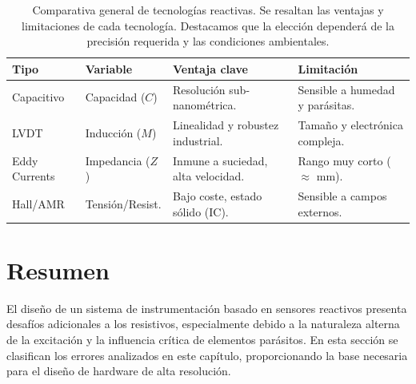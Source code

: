 \begin{table}[!ht]
    \centering
    \forceversofloat %
    \caption[Comparativa general de tecnologías reactivas.]{Comparativa general de tecnologías reactivas. Se resaltan las ventajas y limitaciones de cada tecnología. Destacamos que la elección dependerá de la precisión requerida y las condiciones ambientales.\protect\label{tab:comparativa_final}}
    \setlength{\tabcolsep}{3pt}
    \begin{tabularx}{\linewidth}{M{2cm} M{2cm} X X}
        \toprule
        \textbf{Tipo} & \textbf{Variable} & \textbf{Ventaja clave} & \textbf{Limitación} \\
        \midrule
        Capacitivo & Capacidad ($C$) & Resolución sub-nanométrica. & Sensible a humedad y parásitas. \\
        LVDT & Inducción ($M$) & Linealidad y robustez industrial. & Tamaño y electrónica compleja. \\
        Eddy Currents & Impedancia ($Z$) & Inmune a suciedad, alta velocidad. & Rango muy corto ($\approx$ mm). \\
        Hall/AMR & Tensión/Resist. & Bajo coste, estado sólido (IC). & Sensible a campos externos. \\
        \bottomrule
    \end{tabularx}   
\end{table}


\section{Resumen}\label{sec:errores_reactivos}

El diseño de un sistema de instrumentación basado en sensores reactivos presenta desafíos adicionales a los resistivos, especialmente debido a la naturaleza alterna de la excitación y la influencia crítica de elementos parásitos. En esta sección se clasifican los errores analizados en este capítulo, proporcionando la base necesaria para el diseño de hardware de alta resolución.


